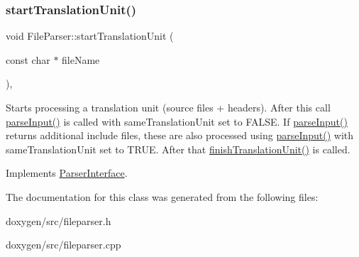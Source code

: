 \subsubsection{\texorpdfstring{startTranslationUnit()}{startTranslationUnit()}}
{\footnotesize\ttfamily void File\+Parser\+::start\+Translation\+Unit (\begin{DoxyParamCaption}\item[{const char $\ast$}]{file\+Name }\end{DoxyParamCaption})\hspace{0.3cm}{\ttfamily [inline]}, {\ttfamily [virtual]}}

Starts processing a translation unit (source files + headers). After this call \mbox{\hyperlink{class_file_parser_a129994a05caded4f7bfe5d30945f008b}{parse\+Input()}} is called with same\+Translation\+Unit set to F\+A\+L\+SE. If \mbox{\hyperlink{class_file_parser_a129994a05caded4f7bfe5d30945f008b}{parse\+Input()}} returns additional include files, these are also processed using \mbox{\hyperlink{class_file_parser_a129994a05caded4f7bfe5d30945f008b}{parse\+Input()}} with same\+Translation\+Unit set to T\+R\+UE. After that \mbox{\hyperlink{class_file_parser_a08ab809441600d2ace9508c040bc3943}{finish\+Translation\+Unit()}} is called. 

Implements \mbox{\hyperlink{class_parser_interface_a72478f87ead5fde10d7d6bbe32a73024}{Parser\+Interface}}.



The documentation for this class was generated from the following files\+:\begin{DoxyCompactItemize}
\item 
doxygen/src/fileparser.\+h\item 
doxygen/src/fileparser.\+cpp\end{DoxyCompactItemize}
